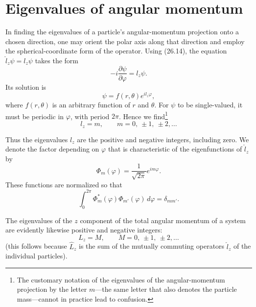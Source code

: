 \section{Eigenvalues of angular momentum}

In finding the eigenvalues of a particle's angular-momentum projection
onto a chosen direction, one may orient the polar axis along that direction
and employ the spherical-coordinate form of the operator. Using (26.14), the equation
$\hat l_z\psi=l_z\psi$ takes the form
\begin{equation}
  -i\frac{\partial\psi}{\partial\varphi}=l_z\psi.
  \tag{27.1}
\end{equation}
Its solution is
\[
  \psi=f(r,\theta)e^{il_z\varphi},
\]
where $f(r,\theta)$ is an arbitrary function of $r$ and $\theta$. For
$\psi$ to be single-valued, it must be periodic in $\varphi$, with period
$2\pi$. Hence we find\footnote{The customary notation of the eigenvalues of
the angular-momentum projection by the letter $m$---the same letter that also
denotes the particle mass---cannot in practice lead to confusion.}
\begin{equation}
  l_z=m,\qquad m=0,\ \pm1,\ \pm2,\ldots
  \tag{27.2}
\end{equation}

Thus the eigenvalues $l_z$ are the positive and negative integers, including
zero. We denote the factor depending on $\varphi$ that is characteristic of
the eigenfunctions of $\hat l_z$ by
\begin{equation}
  \Phi_m(\varphi)=\frac{1}{\sqrt{2\pi}}e^{im\varphi}.
  \tag{27.3}
\end{equation}
These functions are normalized so that
\begin{equation}
  \int_0^{2\pi}\Phi_m^*(\varphi)\Phi_{m'}(\varphi)\,d\varphi
  =\delta_{mm'}.
  \tag{27.4}
\end{equation}

The eigenvalues of the $z$ component of the total angular momentum of a system
are evidently likewise positive and negative integers:
\begin{equation}
  L_z=M,\qquad M=0,\ \pm1,\ \pm2,\ldots
  \tag{27.5}
\end{equation}
(this follows because $\hat L_z$ is the sum of the mutually commuting
operators $\hat l_z$ of the individual particles).

